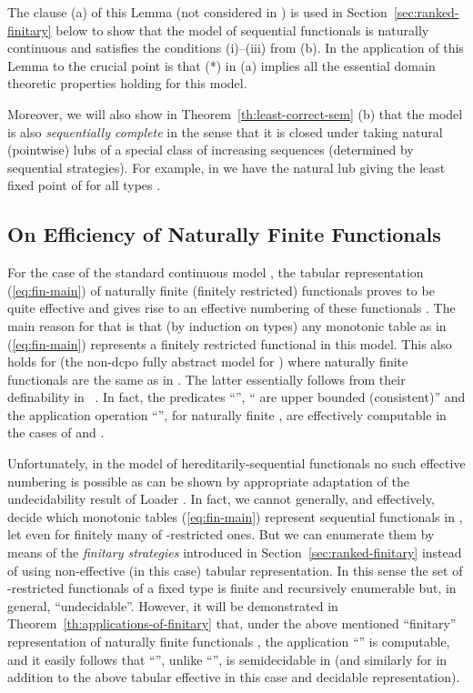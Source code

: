 \documentclass[fleqn]{LMCS}
\theoremstyle{plain}\newtheorem{satz}[thm]{Satz}
\theoremstyle{plain}\newtheorem{hyp}[thm]{Hypothesis}
\theoremstyle{plain}\newtheorem{hyps}[thm]{Hypotheses}
\theoremstyle{definition}\newtheorem{note}[thm]{Note}
\newcommand{\?}{\mbox{?}}
\begin{document}
\noindent
The clause (a) of this Lemma (not considered in \cite{Milner77}) 
is used in Section~\ref{sec:ranked-finitary} below to show that 
the model of sequential functionals  
is naturally continuous and satisfies the conditions (i)--(iii) from (b). 
In the application of this Lemma to  the crucial point 
is that (*) in (a) implies all the essential domain theoretic properties 
holding for this model. 



Moreover, we will also show in Theorem~\ref{th:least-correct-sem} (b) 
that the model  
is also \emph{sequentially complete} in the sense that it is closed 
under taking natural (pointwise) lubs of a special class of increasing 
sequences (determined by sequential strategies). 
For example, in  we have the natural lub 
 giving the least fixed point of  
for all types . 

\subsection{On Efficiency of Naturally Finite Functionals}
\label{sec:efficiency}


For the case of the standard continuous model ,
the tabular representation (\ref{eq:fin-main}) of naturally finite 
(finitely restricted) functionals proves to be quite effective and 
gives rise to an effective numbering 
of these functionals \cite{Ershov72}. The main reason for that is that 
(by induction on types)
any monotonic table as in (\ref{eq:fin-main}) represents a finitely restricted 
functional in this model. This also holds 
for  (the non-dcpo fully abstract model for ) 
where naturally finite functionals are the same as in . 
The latter essentially follows from 
their definability in ~\cite{Plotkin77}. In fact, the predicates 
``'', `` are upper bounded (consistent)'' 
and the application operation ``'', for naturally finite , 
are effectively computable in the cases of  and . 


Unfortunately, in the model of hereditarily-sequential functionals 
 no such effective numbering is possible as can be shown 
by appropriate adaptation of the undecidability result of Loader \cite{LoaderTCS2001}. 
In fact, we cannot generally, and effectively, decide which monotonic 
tables (\ref{eq:fin-main}) represent sequential functionals in , 
let even for finitely many of -restricted ones. 
But we can enumerate them 
by means of the \emph{finitary strategies} introduced in Section~\ref{sec:ranked-finitary} 
instead of using non-effective (in this case) tabular representation. 
In this sense the set of -restricted 
functionals of a fixed type  is finite and recursively enumerable but, 
in general, ``undecidable''. 
However, it will be demonstrated in Theorem~\ref{th:applications-of-finitary} that, 
under the above mentioned ``finitary'' representation of naturally finite functionals 
, 
the application ``'' is computable, and it easily follows that 
``'', 
unlike ``'', is semidecidable 
in  
(and similarly for  in addition to the above tabular 
effective in this case and decidable representation). 
\end{document}
